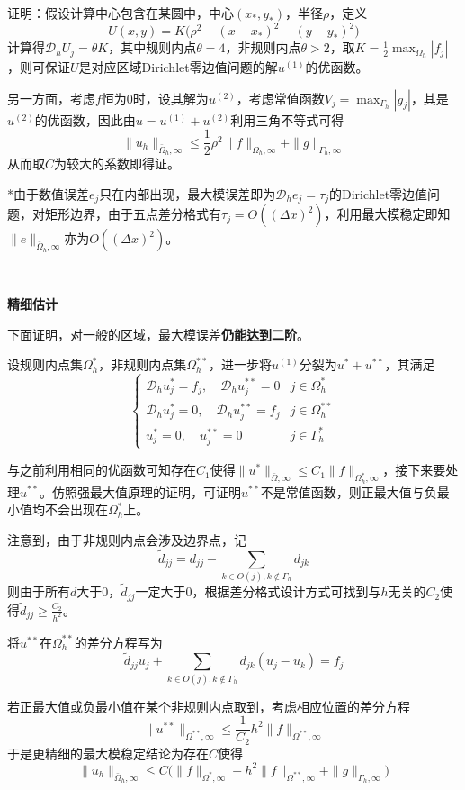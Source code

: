 \documentclass[a4paper,UTF8,fontset=windows]{ctexart}
\begin{document}
证明：假设计算中心包含在某圆中，中心$(x_*,y_*)$，半径$\rho$，定义
$$U(x,y)=K\big(\rho^2-(x-x_*)^2-(y-y_*)^2\big)$$
计算得$\mathcal{D}_hU_j=\theta K$，其中规则内点$\theta=4$，非规则内点$\theta>2$，取$K=\frac{1}{2}\max_{\Omega_h}|f_j|$，则可保证$U$是对应区域Dirichlet零边值问题的解$u^{(1)}$的优函数。

另一方面，考虑$f$恒为0时，设其解为$u^{(2)}$，考虑常值函数$V_j=\max_{\Gamma_h}|g_j|$，其是$u^{(2)}$的优函数，因此由$u=u^{(1)}+u^{(2)}$利用三角不等式可得
$$\|u_h\|_{\bar{\Omega}_h,\infty}\le\frac{1}{2}\rho^2\|f\|_{\Omega_h,\infty}+\|g\|_{\Gamma_h,\infty}$$
从而取$C$为较大的系数即得证。

*由于数值误差$e_j$只在内部出现，最大模误差即为$\mathcal{D}_he_j=\tau_j$的Dirichlet零边值问题，对矩形边界，由于五点差分格式有$\tau_j=O((\Delta x)^2)$，利用最大模稳定即知$\|e\|_{\bar{\Omega}_h,\infty}$亦为$O((\Delta x)^2)$。

\

\textbf{精细估计}

下面证明，对一般的区域，最大模误差\textbf{仍能达到二阶}。

设规则内点集$\Omega_h^*$，非规则内点集$\Omega_h^{**}$，进一步将$u^{(1)}$分裂为$u^*+u^{**}$，其满足
$$\begin{cases}\mathcal{D}_hu_j^*=f_j,\quad\mathcal{D}_hu_j^{**}=0&j\in\Omega_h^*\\\mathcal{D}_hu_j^*=0,\quad\mathcal{D}_hu_j^{**}=f_j&j\in\Omega_h^{**}\\u_j^*=0,\quad u_j^{**}=0&j\in\Gamma_h^*\end{cases}$$

与之前利用相同的优函数可知存在$C_1$使得$\|u^*\|_{\bar{\Omega},\infty}\le C_1\|f\|_{\Omega_h^*,\infty}$，接下来要处理$u^{**}$。仿照强最大值原理的证明，可证明$u^{**}$不是常值函数，则正最大值与负最小值均不会出现在$\Omega_h^*$上。

注意到，由于非规则内点会涉及边界点，记
$$\tilde{d}_{jj}=d_{jj}-\sum_{k\in O(j),k\notin\Gamma_h}d_{jk}$$
则由于所有$d$大于0，$\tilde{d}_{jj}$一定大于0，根据差分格式设计方式可找到与$h$无关的$C_2$使得$\tilde{d}_{jj}\ge\frac{C_2}{h^2}$。

将$u^{**}$在$\Omega_h^{**}$的差分方程写为
$$\tilde{d}_{jj}u_j+\sum_{k\in O(j),k\notin\Gamma_h}d_{jk}(u_j-u_k)=f_j$$

若正最大值或负最小值在某个非规则内点取到，考虑相应位置的差分方程
$$\|u^{**}\|_{\Omega^{**},\infty}\le\frac{1}{C_2}h^2\|f\|_{\Omega^{**},\infty}$$
于是更精细的最大模稳定结论为存在$C$使得
$$\|u_h\|_{\bar{\Omega}_h,\infty}\le C\big(\|f\|_{\Omega^*,\infty}+h^2\|f\|_{\Omega^{**},\infty}+\|g\|_{\Gamma_h,\infty}\big)$$
\end{document}
